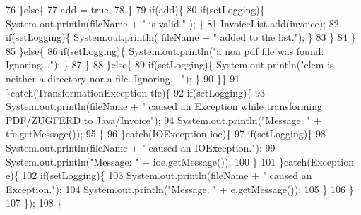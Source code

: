 \begin{DoxyCode}
76                             \}\textcolor{keywordflow}{else}\{
77                                 add = \textcolor{keyword}{true};
78                             \}
79                             \textcolor{keywordflow}{if}(add)\{
80                                 \textcolor{keywordflow}{if}(setLogging)\{ System.out.println(fileName + \textcolor{stringliteral}{" is valid."} ); \}
81                                 InvoiceList.add(invoice);
82                                 \textcolor{keywordflow}{if}(setLogging)\{ System.out.println( fileName + \textcolor{stringliteral}{" added to the list."}); \}
83                             \}
84                         \}
85                     \}\textcolor{keywordflow}{else}\{
86                         \textcolor{keywordflow}{if}(setLogging)\{ System.out.println(\textcolor{stringliteral}{"a non pdf file was found. Ignoring..."}); \}
87                     \}
88                 \}\textcolor{keywordflow}{else}\{
89                     \textcolor{keywordflow}{if}(setLogging)\{ System.out.println(\textcolor{stringliteral}{"elem is neither a directory nor a file. Ignoring...
      "}); \}
90                 \}\}
91             \}\textcolor{keywordflow}{catch}(TransformationException tfe)\{
92                 \textcolor{keywordflow}{if}(setLogging)\{ 
93                     System.out.println(fileName + \textcolor{stringliteral}{" caused an Exception while transforming PDF/ZUGFERD to
       Java/Invoice"});
94                     System.out.println(\textcolor{stringliteral}{"Message: "} + tfe.getMessage());
95                 \}
96             \}\textcolor{keywordflow}{catch}(IOException ioe)\{
97                 \textcolor{keywordflow}{if}(setLogging)\{ 
98                     System.out.println(fileName + \textcolor{stringliteral}{" caused an IOException."});
99                     System.out.println(\textcolor{stringliteral}{"Message: "} + ioe.getMessage());
100                 \}
101             \}\textcolor{keywordflow}{catch}(Exception e)\{
102                 \textcolor{keywordflow}{if}(setLogging)\{ 
103                     System.out.println(fileName + \textcolor{stringliteral}{" caused an Exception."});
104                     System.out.println(\textcolor{stringliteral}{"Message: "} + e.getMessage());
105                 \}
106             \}
107         \});
108     \}
\end{DoxyCode}
